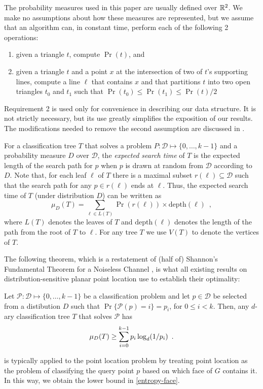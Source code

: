 \documentclass[lotsofwhite]{patmorin}
\newcommand{\depth}{\mathrm{depth}}
\begin{document}
The probability measures used in this paper are usually defined over
$\mathbb{R}^2$.  We make no assumptions about how these measures are
represented, but we assume that an algorithm can, in constant time,
perform each of the following 2 operations:
\begin{enumerate}
\item given a triangle $t$, compute $\Pr(t)$, and
\item given a triangle $t$ and a point $x$ at the
intersection of two of $t$'s supporting lines, compute a line $\ell$
that contains $x$ and that partitions $t$ into two open triangles
$t_0$ and $t_1$ such that $\Pr(t_0)\le\Pr(t_1)\le\Pr(t)/2$
\end{enumerate}
Requirement 2 is used only for convenience in describing our data
structure.  It is not strictly necessary, but its use greatly
simplifies the exposition of our results.  The modifications needed to
remove the second assumption are discussed in .

For a classification tree $T$ that solves a problem
$P:\mathcal{D}\mapsto\{0,\ldots,k-1\}$ and a probability measure $D$
over $\mathcal{D}$, the \emph{expected search time} of $T$ is the
expected length of the search path for $p$ when $p$ is drawn at random
from $\mathcal{D}$ according to $D$.  Note that, for each leaf $\ell$
of $T$ there is a maximal subset $r(\ell)\subseteq \mathcal{D}$ such
that the search path for any $p\in r(\ell)$ ends at $\ell$.  Thus, the
expected search time of $T$ (under distribution $D$) can be written as
\[
     \mu_D(T) = \sum_{\ell\in L(T)} \Pr(r(\ell))\times \depth(\ell)
	\enspace ,
\]
where $L(T)$ denotes the leaves of $T$ and $\depth(\ell)$ denotes the
length of the path from the root of $T$ to $\ell$.  For any tree $T$
we use $V(T)$ to denote the vertices of $T$.

The following theorem, which is a restatement of (half of) Shannon's
Fundamental Theorem for a Noiseless Channel \cite[Theorem 9]{s48}, is
what all existing results on distribution-sensitive planar point
location use to establish their optimality:

\begin{thm}
Let $\mathcal{P}:\mathcal{D}\mapsto \{0,\ldots,k-1\}$ be a classification
problem and let $p\in \mathcal{D}$ be selected from a distibution $D$ such
that $\Pr\{\mathcal{P}(p)= i\}=p_i$, for $0\le i< k$.  Then, any
$d$-ary classification tree $T$ that solves $\mathcal{P}$ has
\begin{equation}
     \mu_D(T) \ge \sum_{i=0}^{k-1} p_i\log_d(1/p_i) \enspace .
	\eqlabel{shannon}
\end{equation}
\end{thm}
 is typically applied to the point location problem by
treating point location as the problem of classifying the query point
$p$ based on which face of $G$ contains it.  In this way, we obtain
the lower bound in \eqref{entropy-face}.
\end{document}
